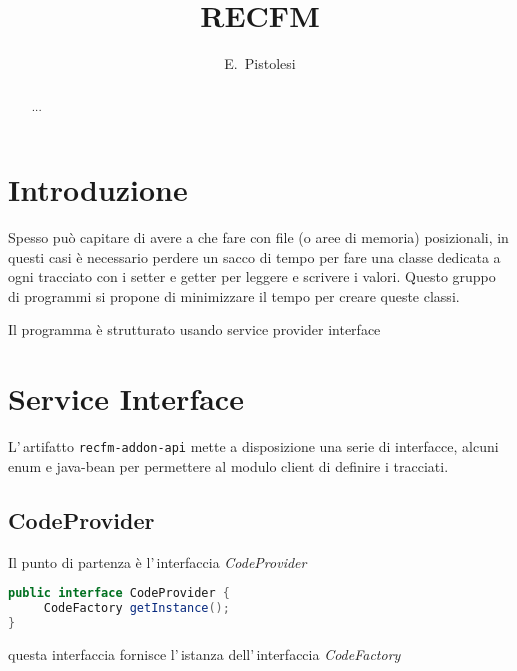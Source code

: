 \documentclass[a4paper,10pt]{report}
\title{RECFM}
\author{E.~Pistolesi}
\begin{document}
\maketitle

\begin{abstract}
...
\end{abstract}


%


\tableofcontents
\listoftables
\lstlistoflistings

\clearpage

\chapter{Introduzione}
Spesso può capitare di avere a che fare con file (o aree di memoria)
posizionali, in questi casi è necessario perdere un sacco di tempo per fare una
classe dedicata a ogni tracciato con i setter e getter per leggere e scrivere
i valori. 
Questo gruppo di programmi si propone di minimizzare il tempo per creare queste
classi.

Il programma è strutturato usando service provider interface


\chapter{Service Interface}
L'\,artifatto \verb!recfm-addon-api! mette a disposizione una serie di 
interfacce, alcuni enum e java-bean per permettere al modulo client di definire
i tracciati. 

\section{CodeProvider}
Il punto di partenza è l'\,interfaccia \textsl{CodeProvider}

\begin{lstlisting}[language=java, caption=interfaccia CodeProvider, 
label=code:CodeProvider]
public interface CodeProvider {
     CodeFactory getInstance();
}
\end{lstlisting}
questa interfaccia fornisce l'\,istanza dell'\,interfaccia \textsl{CodeFactory}
\end{document}
